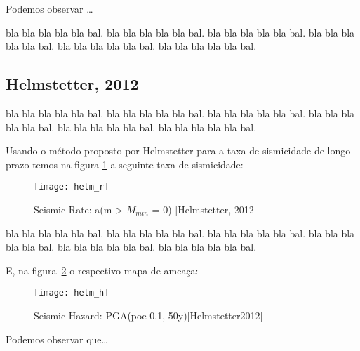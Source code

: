Podemos observar \ldots

bla bla bla bla bla bal.
bla bla bla bla bla bal.
bla bla bla bla bla bal.
bla bla bla bla bla bal.
bla bla bla bla bla bal.
bla bla bla bla bla bal.


\subsection{Helmstetter, 2012}
\label{sec:fundamentos}

bla bla bla bla bla bal.
bla bla bla bla bla bal.
bla bla bla bla bla bal.
bla bla bla bla bla bal.
bla bla bla bla bla bal.
bla bla bla bla bla bal.

Usando o método proposto por Helmstetter para a taxa de sismicidade de
longo-prazo temos na figura \ref{fig:helm_r} a seguinte taxa de sismicidade:

\begin{figure}[!h]
  \centering
  \texttt{[image: helm\_r]} 
  \caption{Seismic Rate: a(m > $M_{min}$ = 0) [Helmstetter, 2012] }
  \label{fig:helm_r} 
\end{figure}

bla bla bla bla bla bal.
bla bla bla bla bla bal.
bla bla bla bla bla bal.
bla bla bla bla bla bal.
bla bla bla bla bla bal.
bla bla bla bla bla bal.

E, na figura~\ref{fig:helm_h} o respectivo mapa de ameaça:

\begin{figure}[!h]
  \centering
  \texttt{[image: helm\_h]} 
  \caption{Seismic Hazard: PGA(poe 0.1, 50y)[Helmstetter2012] }
  \label{fig:helm_h} 
\end{figure}


Podemos observar que\ldots

